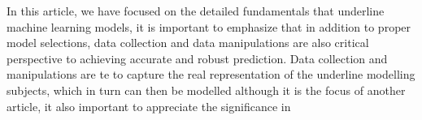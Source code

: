 
\par
In this article, we have focused on the detailed fundamentals that underline machine learning models, it is important to emphasize that in addition to proper model selections, data collection and data manipulations are also critical perspective to achieving accurate and robust prediction. Data collection and manipulations are te to capture the real representation of the underline modelling subjects, which in turn can then be modelled  although it is the focus of another article, it also important to appreciate the significance in 
\par 
